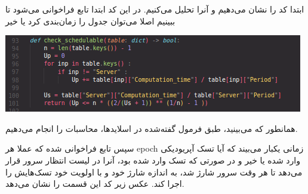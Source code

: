ابتدا کد را نشان می‌دهیم و آنرا تحلیل می‌کنیم.
در این کد ابتدا تابع 
فراخوانی می‌شود تا ببینیم اصلا می‌توان جدول را زمان‌بندی کرد یا خیر
\begin{center}
  \includegraphics[scale=0.5]{pics/s1.png}
\end{center}
همانطور که می‌بینید، طبق فرمول گفته‌شده در اسلایدها، محاسبات را انجام می‌دهیم.

سپس تابع 
فراخوانی شده که عملا هر epoch 
زمانی یکبار می‌بیند که آیا تسک آپریودیکی وارد شده یا خیر و در صورتی که تسک وارد شده بود،‌ آنرا در لیست
انتظار سرور قرار می‌دهد تا هر وقت سرور شارژ شد، به اندازه شارژ خود و با اولویت خود تسک‌هایش را اجرا کند.
عکس زیر کد این قسمت را نشان می‌دهد.

